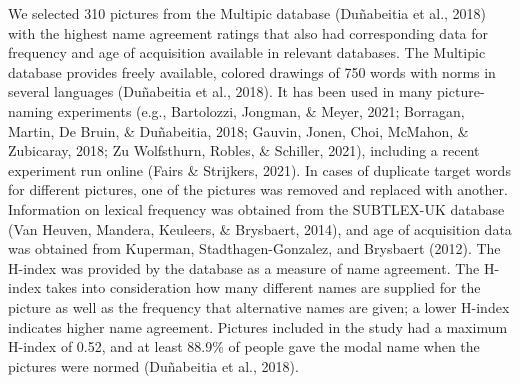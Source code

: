 \documentclass[
  man,floatsintext]{apa6}
\begin{document}
We selected 310 pictures from the Multipic database (Duñabeitia et al., 2018) with the highest name agreement ratings that also had corresponding data for frequency and age of acquisition available in relevant databases. The Multipic database provides freely available, colored drawings of 750 words with norms in several languages (Duñabeitia et al., 2018). It has been used in many picture-naming experiments (e.g., Bartolozzi, Jongman, \& Meyer, 2021; Borragan, Martin, De Bruin, \& Duñabeitia, 2018; Gauvin, Jonen, Choi, McMahon, \& Zubicaray, 2018; Zu Wolfsthurn, Robles, \& Schiller, 2021), including a recent experiment run online (Fairs \& Strijkers, 2021). In cases of duplicate target words for different pictures, one of the pictures was removed and replaced with another. Information on lexical frequency was obtained from the SUBTLEX-UK database (Van Heuven, Mandera, Keuleers, \& Brysbaert, 2014), and age of acquisition data was obtained from Kuperman, Stadthagen-Gonzalez, and Brysbaert (2012). The H-index was provided by the database as a measure of name agreement. The H-index takes into consideration how many different names are supplied for the picture as well as the frequency that alternative names are given; a lower H-index indicates higher name agreement. Pictures included in the study had a maximum H-index of 0.52, and at least 88.9\% of people gave the modal name when the pictures were normed (Duñabeitia et al., 2018).
\end{document}
